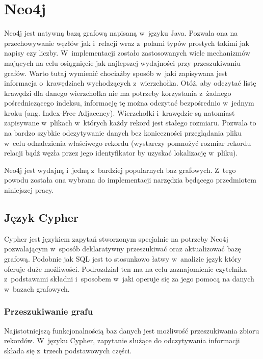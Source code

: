 \documentclass[brudnopis]{xmgr}
\begin{document}
\chapter{Neo4j}

Neo4j jest natywną bazą grafową napisaną w~języku Java. Pozwala ona na przechowywanie węzłów jak i~relacji wraz z~polami typów prostych takimi jak napisy czy liczby. W~implementacji zostało zastosowanych wiele mechanizmów mających na celu osiągnięcie jak najlepszej wydajności przy przeszukiwaniu grafów. Warto tutaj wymienić chociażby sposób w~jaki zapisywana jest informacja o~krawędziach wychodzących z~wierzchołka. Otóż, aby odczytać listę krawędzi dla danego wierzchołka nie ma potrzeby korzystania z~żadnego pośredniczącego indeksu, informację tę można odczytać bezpośrednio w~jednym kroku (ang. Index-Free Adjacency\cite[s.~5]{Robinson:2013:GD}). Wierzchołki i~krawędzie są natomiast zapisywane w~plikach w~których każdy rekord jest stałego rozmiaru. Pozwala to na bardzo szybkie odczytywanie danych bez konieczności przeglądania pliku w~celu odnalezienia właściwego rekordu (wystarczy pomnożyć rozmiar rekordu relacji bądź węzła przez jego identyfikator by uzyskać lokalizację w~pliku).

Neo4j jest wydajną i~jedną z~bardziej popularnych baz grafowych. Z~tego powodu została ona wybrana do implementacji narzędzia będącego przedmiotem niniejszej pracy.

\section{Język Cypher}
Cypher jest językiem zapytań stworzonym specjalnie na potrzeby Neo4j pozwalającym w~sposób deklaratywny przeszukiwać oraz aktualizować bazę grafową. Podobnie jak SQL jest to stosunkowo łatwy w~analizie język który oferuje duże możliwości. Podrozdział ten ma na celu zaznajomienie czytelnika z~podstawami składni i~sposobem w~jaki operuje się za jego pomocą na danych w~bazach grafowych.

\newpage

\subsection{Przeszukiwanie grafu}

Najistotniejszą funkcjonalnością baz danych jest możliwość przeszukiwania zbioru rekordów. W~języku Cypher, zapytanie służące do odczytywania informacji składa się z~trzech podstawowych części.
\end{document}
